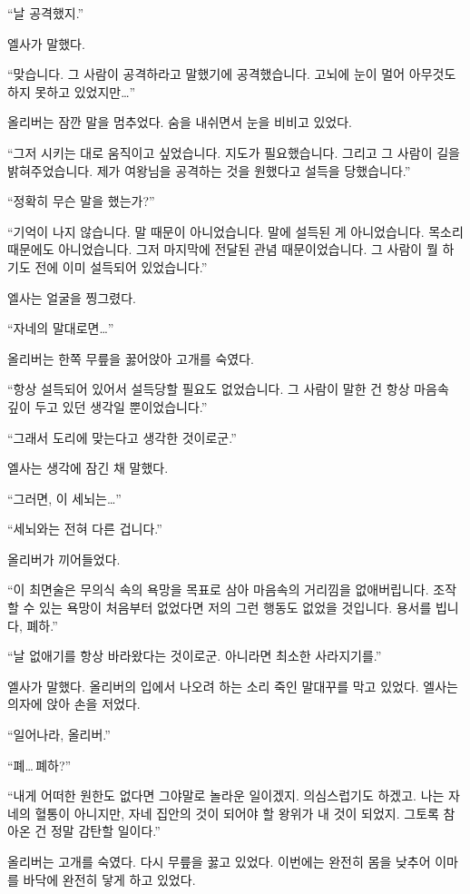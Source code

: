 ``날 공격했지.''

엘사가 말했다.

``맞습니다. 그 사람이 공격하라고 말했기에 공격했습니다. 고뇌에 눈이 멀어 아무것도 하지 못하고 있었지만\ldots''

올리버는 잠깐 말을 멈추었다. 숨을 내쉬면서 눈을 비비고 있었다.

``그저 시키는 대로 움직이고 싶었습니다. 지도가 필요했습니다. 그리고 그 사람이 길을 밝혀주었습니다. 제가 여왕님을 공격하는 것을 원했다고 설득을 당했습니다.''

``정확히 무슨 말을 했는가?''

``기억이 나지 않습니다. 말 때문이 아니었습니다. 말에 설득된 게 아니었습니다. 목소리 때문에도 아니었습니다. 그저 마지막에 전달된 관념 때문이었습니다. 그 사람이 뭘 하기도 전에 이미 설득되어 있었습니다.''

엘사는 얼굴을 찡그렸다.

``자네의 말대로면\ldots''

올리버는 한쪽 무릎을 꿇어앉아 고개를 숙였다.

``항상 설득되어 있어서 설득당할 필요도 없었습니다. 그 사람이 말한 건 항상 마음속 깊이 두고 있던 생각일 뿐이었습니다.''

``그래서 도리에 맞는다고 생각한 것이로군.''

엘사는 생각에 잠긴 채 말했다.

``그러면, 이 세뇌는\ldots''

``세뇌와는 전혀 다른 겁니다.''

올리버가 끼어들었다.

``이 최면술은 무의식 속의 욕망을 목표로 삼아 마음속의 거리낌을 없애버립니다. 조작할 수 있는 욕망이 처음부터 없었다면 저의 그런 행동도 없었을 것입니다. 용서를 빕니다, 폐하.''

`` 날 없애기를 항상 바라왔다는 것이로군. 아니라면 최소한 사라지기를.''

엘사가 말했다. 올리버의 입에서 나오려 하는 소리 죽인 말대꾸를 막고 있었다. 엘사는 의자에 앉아 손을 저었다.

``일어나라, 올리버.''

``폐\ldots\,폐하?''

``내게 어떠한 원한도 없다면 그야말로 놀라운 일이겠지. 의심스럽기도 하겠고. 나는 자네의 혈통이 아니지만, 자네 집안의 것이 되어야 할 왕위가 내 것이 되었지. 그토록 참아온 건 정말 감탄할 일이다.''

올리버는 고개를 숙였다. 다시 무릎을 꿇고 있었다. 이번에는 완전히 몸을 낮추어 이마를 바닥에 완전히 닿게 하고 있었다.


